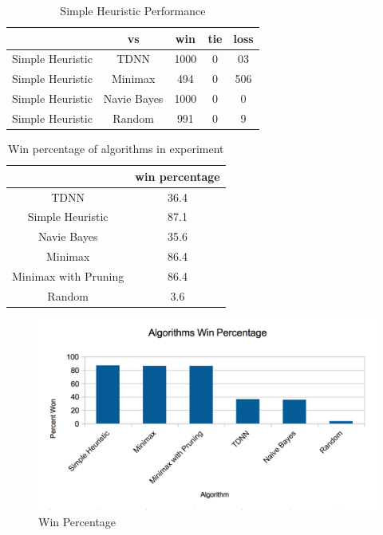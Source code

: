 \documentclass[12pt,letterpaper]{article}
\begin{document}
\begin{table}
\begin{center}
\begin{tabular}{|c||c|c|c|c|}
\hline
& vs & win & tie & loss\\
\hline \hline
Simple Heuristic & TDNN & 1000 & 0 & 03\\
\hline 
Simple Heuristic & Minimax & 494 & 0 & 506\\
\hline 
Simple Heuristic & Navie Bayes & 1000 & 0 & 0\\
\hline 
Simple Heuristic & Random & 991 & 0 & 9\\
\hline 
\end{tabular}
\end{center}
\caption{Simple Heuristic Performance}
\label{sometable}
\end{table}

\begin{table}
\begin{center}
\begin{tabular}{|c||c|}
\hline
& win percentage\\
\hline \hline
TDNN & 36.4\\
\hline 
Simple Heuristic & 87.1\\
\hline 
Navie Bayes & 35.6\\
\hline 
Minimax & 86.4\\
\hline 
Minimax with Pruning & 86.4\\
\hline 
Random & 3.6\\
\hline 
\end{tabular}
\end{center}
\caption{Win percentage of algorithms in experiment}
\label{sometable}
\end{table}

\begin{figure}
\begin{center}
\includegraphics[width=7in]{winpercent.png}
\end{center}
\caption{Win Percentage}
\label{somefigure}
\end{figure}
\end{document}
